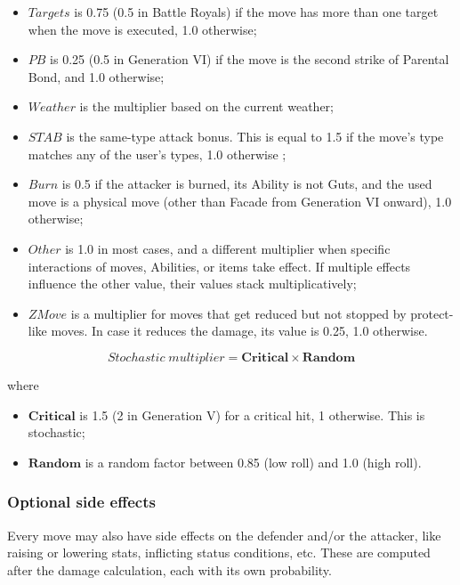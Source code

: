 \documentclass{article}
\begin{document}
\begin{itemize}
    \item $Targets$ is 0.75 (0.5 in Battle Royals) if the move has more than one target when the move is executed, 1.0 otherwise;
    \item $PB$ is 0.25 (0.5 in Generation VI) if the move is the second strike of Parental Bond, and 1.0 otherwise;
    \item $Weather$ is the multiplier based on the current weather;
    \item $STAB$ is the same-type attack bonus. This is equal to 1.5 if the move's type matches any of the user's types, 1.0 otherwise ;
    \item $Burn$ is 0.5 if the attacker is burned, its Ability is not Guts, and the used move is a physical move (other than Facade from Generation VI onward), 1.0 otherwise;
    \item $Other$ is 1.0 in most cases, and a different multiplier when specific interactions of moves, Abilities, or items take effect. If multiple effects influence the other value, their values stack multiplicatively;
    \item $ZMove$ is a multiplier for moves that get reduced but not stopped by protect-like moves. In case it reduces the damage, its value is 0.25, 1.0 otherwise.
\end{itemize}

\begin{equation}
    Stochastic \; multiplier = \textbf{Critical} \times \textbf{Random}
\end{equation}

where

\begin{itemize}
    \item $\textbf{Critical}$ is 1.5 (2 in Generation V) for a critical hit, 1 otherwise. This is stochastic;
    \item $\textbf{Random}$ is a random factor between 0.85 (low roll) and 1.0 (high roll).
\end{itemize}

\subsubsection{Optional side effects}

Every move may also have side effects on the defender and/or the attacker, like raising or lowering stats, inflicting status conditions, etc.
These are computed after the damage calculation, each with its own probability.
\end{document}
